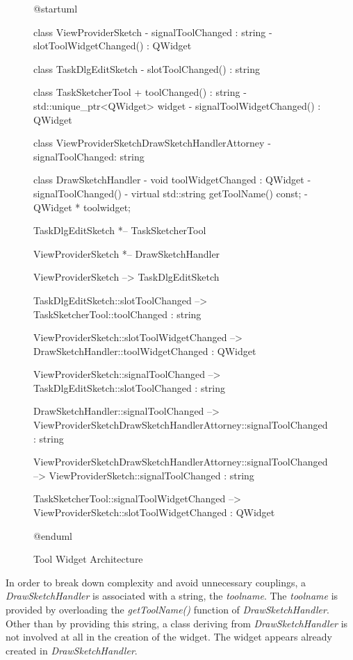 \documentclass[12pt,twoside,a4paper]{book}
\newcommand{\DrawSketchHandler}{\emph{DrawSketchHandler}}
\begin{document}
   \begin{figure}
    \centering
    \caption{Tool Widget Architecture}
        \begin{plantuml}
        @startuml

        class ViewProviderSketch{
            - signalToolChanged : string
            - slotToolWidgetChanged() : QWidget
        }

        class TaskDlgEditSketch {
            - slotToolChanged() : string
        }

        class TaskSketcherTool{
            + toolChanged() : string
            - std::unique_ptr<QWidget> widget
            - signalToolWidgetChanged() : QWidget
        }

        class ViewProviderSketchDrawSketchHandlerAttorney {
            - signalToolChanged: string
        }

        class DrawSketchHandler{
            - void toolWidgetChanged : QWidget
            - signalToolChanged()
            - virtual std::string getToolName() const;
            - QWidget * toolwidget;
        }

        TaskDlgEditSketch *-- TaskSketcherTool

        ViewProviderSketch *-- DrawSketchHandler

        ViewProviderSketch --> TaskDlgEditSketch

        TaskDlgEditSketch::slotToolChanged --> TaskSketcherTool::toolChanged : string

        ViewProviderSketch::slotToolWidgetChanged --> DrawSketchHandler::toolWidgetChanged : QWidget

        ViewProviderSketch::signalToolChanged --> TaskDlgEditSketch::slotToolChanged : string

        DrawSketchHandler::signalToolChanged --> ViewProviderSketchDrawSketchHandlerAttorney::signalToolChanged : string

        ViewProviderSketchDrawSketchHandlerAttorney::signalToolChanged --> ViewProviderSketch::signalToolChanged : string

        TaskSketcherTool::signalToolWidgetChanged --> ViewProviderSketch::slotToolWidgetChanged : QWidget

        @enduml
        \end{plantuml}
    \end{figure}

    In order to break down complexity and avoid unnecessary couplings, a \DrawSketchHandler{} is associated with a string, the \emph{toolname}. The \emph{toolname} is provided by overloading the \emph{getToolName()} function of \DrawSketchHandler{}. Other than by providing this string, a class deriving from \DrawSketchHandler{} is not involved at all in the creation of the widget. The widget appears already created in \DrawSketchHandler{}.
\end{document}
